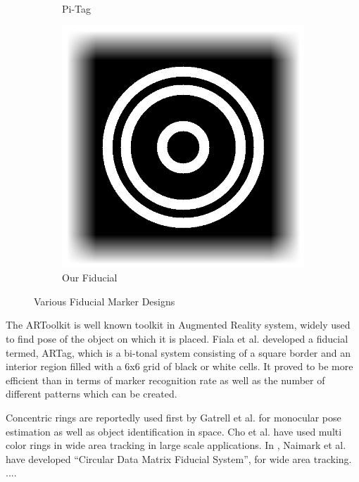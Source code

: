 \documentclass[runningheads]{llncs}
\begin{document}
\begin{figure}
\begin{subfigure}[b]{0.19\textwidth}
  Pi-Tag\cite{Pitag13}
 \end{subfigure}
 \begin{subfigure}[b]{0.19\textwidth}
  \centering
  \includegraphics[width=\linewidth]{our_fiducial}
  Our Fiducial
 \end{subfigure}
 \caption{Various Fiducial Marker Designs}
 \label{fig:previous_work}
\end{figure}

The ARToolkit \cite{ARToolkit02}\cite{kato-artoolkit} is well known toolkit in
Augmented Reality system, widely used to find pose of the object on which it is
placed.  Fiala et al. \cite{Fiala05} developed a fiducial termed, ARTag, which is a
bi-tonal system consisting of a square border and
an interior region filled with a 6x6 grid of black or white cells. It proved to
be more efficient than \cite{ARToolkit02} in terms of marker recognition rate
as well as the number of different patterns which can be created.

Concentric rings are reportedly used first by Gatrell et al.\cite{concentric}
for monocular pose estimation as well as object identification in space. Cho et al.
\cite{Cho:2001}\cite{Cho97fastcolor} have used multi color rings in wide area
tracking in large scale applications. In \cite{NaimarkF02}, Naimark et al.
have developed ``Circular Data Matrix Fiducial System'', for wide area tracking. .... 
\end{document}
